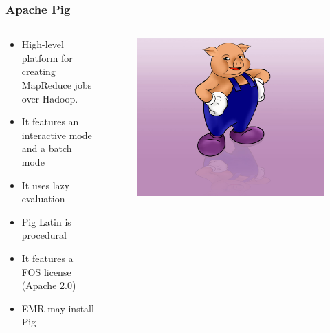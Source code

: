 \documentclass[hyperref={pdfpagelabels=true}]{beamer}
\begin{document}
\begin{frame}
\frametitle{Apache Pig}
\begin{columns}
  \begin{column}{0.5\textwidth}
    \begin{itemize}
      \item<1->High-level platform for creating MapReduce jobs over Hadoop.%
      \item<2->It features an interactive mode and a batch mode
      \item<3->It uses lazy evaluation %
      \item<4->Pig Latin is procedural %
      \item<5->It features a FOS license (Apache 2.0)
      \item<6->EMR may install Pig
    \end{itemize}    
  \end{column}
  \begin{column}{0.5\textwidth}
      \begin{figure}  
	\includegraphics[width=\textwidth]{pig_logo.jpg}
       \end{figure}  
  \end{column}  
\end{columns}
\end{frame}
\end{document}
